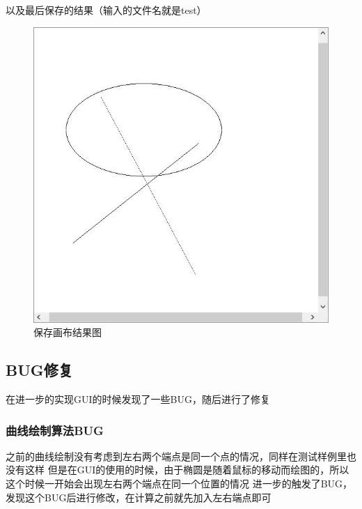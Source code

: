 \documentclass[a4paper,UTF8]{article}
\theoremstyle{definition}
\begin{document}
以及最后保存的结果（输入的文件名就是test）
\begin{figure}[h]
	\centering
	\includegraphics[scale=0.5]{figure/test.jpg}
	\caption{保存画布结果图}
	\label{fig:SaveCanvas}
\end{figure}

\subsection{BUG修复}
在进一步的实现GUI的时候发现了一些BUG，随后进行了修复

\subsubsection{曲线绘制算法BUG}
之前的曲线绘制没有考虑到左右两个端点是同一个点的情况，同样在测试样例里也没有这样
但是在GUI的使用的时候，由于椭圆是随着鼠标的移动而绘图的，所以这个时候一开始会出现左右两个端点在同一个位置的情况
进一步的触发了BUG，发现这个BUG后进行修改，在计算之前就先加入左右端点即可

 
\end{document}
